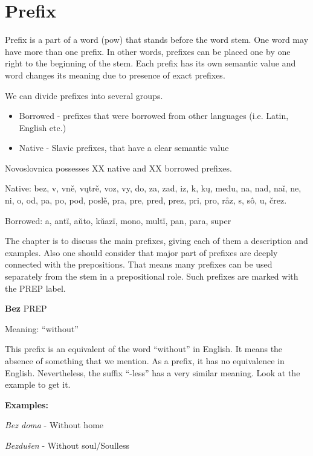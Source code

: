 \section{Prefix}


Prefix is a part of a word (\gls{pow}) that stands before the word stem. One word may have more than one prefix. In other words, prefixes can be placed one by one right to the beginning of the stem. Each prefix has its own semantic value and word changes its meaning due to presence of exact prefixes.

We can divide prefixes into several groups. 

\begin{itemize}
	\item Borrowed - prefixes that were borrowed from other languages (i.e. Latin, English etc.)
	\item Native - Slavic prefixes, that have a clear semantic value
\end{itemize}

Novoslovnica possesses XX native and XX borrowed prefixes.

Native: bez, v, vně, vųtrě, voz, vy, do, za, zad, iz, k, kų, među, na, nad, naǐ, ne, ni, o, od, pa, po, pod, poslě, pra, pre, pred, prez, pri, pro, råz, s, sô, u, črez.

Borrowed: a, antï, aŭto, kŭazï, mono, multï, pan, para, super

The chapter is to discuss the main prefixes, giving each of them a description and examples. Also one should consider that major part of prefixes are deeply connected with the prepositions. That means many prefixes can be used separately from the stem in a prepositional role. Such prefixes are marked with the PREP label. 

\textbf{Bez} PREP

Meaning: “without”

This prefix is an equivalent of the word “without” in English. It means the absence of something that we mention. As a prefix, it has no equivalence in English. Nevertheless, the suffix “-less” has a very similar meaning. Look at the example to get it.

\textbf{Examples:}

\textit{Bez doma} - Without home

\textit{Bezdušen} - Without soul/Soulless 


